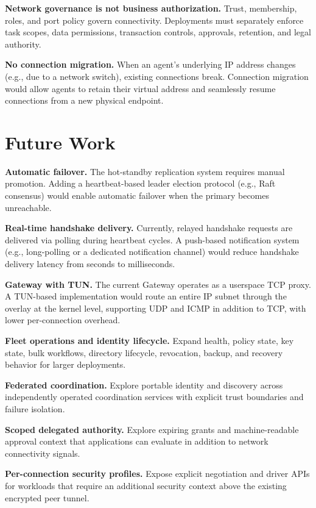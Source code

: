 \documentclass[11pt,a4paper]{article}
\begin{document}
\textbf{Network governance is not business authorization.} Trust, membership, roles, and port policy govern connectivity. Deployments must separately enforce task scopes, data permissions, transaction controls, approvals, retention, and legal authority.

\textbf{No connection migration.} When an agent's underlying IP address changes (e.g., due to a network switch), existing connections break. Connection migration would allow agents to retain their virtual address and seamlessly resume connections from a new physical endpoint.

\section{Future Work}

\textbf{Automatic failover.} The hot-standby replication system requires manual promotion. Adding a heartbeat-based leader election protocol (e.g., Raft consensus) would enable automatic failover when the primary becomes unreachable.

\textbf{Real-time handshake delivery.} Currently, relayed handshake requests are delivered via polling during heartbeat cycles. A push-based notification system (e.g., long-polling or a dedicated notification channel) would reduce handshake delivery latency from seconds to milliseconds.

\textbf{Gateway with TUN.} The current Gateway operates as a userspace TCP proxy. A TUN-based implementation would route an entire IP subnet through the overlay at the kernel level, supporting UDP and ICMP in addition to TCP, with lower per-connection overhead.

\textbf{Fleet operations and identity lifecycle.} Expand health, policy state, key state, bulk workflows, directory lifecycle, revocation, backup, and recovery behavior for larger deployments.

\textbf{Federated coordination.} Explore portable identity and discovery across independently operated coordination services with explicit trust boundaries and failure isolation.

\textbf{Scoped delegated authority.} Explore expiring grants and machine-readable approval context that applications can evaluate in addition to network connectivity signals.

\textbf{Per-connection security profiles.} Expose explicit negotiation and driver APIs for workloads that require an additional security context above the existing encrypted peer tunnel.
\end{document}
